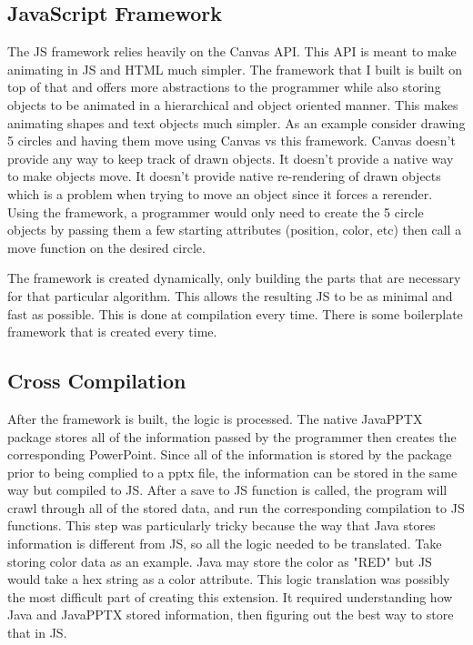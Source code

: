 \documentclass[12pt,twoside]{reedthesis}
\begin{document}
\subsection{JavaScript Framework}
The JS framework relies heavily on the Canvas API. This API is meant to make animating in JS and HTML much simpler. The framework that I built is built on top of that and offers more abstractions to the programmer while also storing objects to be animated in a hierarchical and object oriented manner. This makes animating shapes and text objects much simpler. As an example consider drawing 5 circles and having them move using Canvas vs this framework. Canvas doesn't provide any way to keep track of drawn objects. It doesn't provide a native way to make objects move. It doesn't provide native re-rendering of drawn objects which is a problem when trying to move an object since it forces a rerender. Using the framework, a programmer would only need to create the 5 circle objects by passing them a few starting attributes (position, color, etc) then call a move function on the desired circle.

The framework is created dynamically, only building the parts that are necessary for that particular algorithm. This allows the resulting JS to be as minimal and fast as possible. This is done at compilation every time. There is some boilerplate framework that is created every time. 

\subsection{Cross Compilation}
After the framework is built, the logic is processed. The native JavaPPTX package stores all of the information passed by the programmer then creates the corresponding PowerPoint. Since all of the information is stored by the package prior to being complied to a pptx file, the information can be stored in the same way but compiled to JS. After a save to JS function is called, the program will crawl through all of the stored data, and run the corresponding compilation to JS functions. This step was particularly tricky because the way that Java stores information is different from JS, so all the logic needed to be translated. Take storing color data as an example. Java may store the color as "RED" but JS would take a hex string as a color attribute. This logic translation was possibly the most difficult part of creating this extension. It required understanding how Java and  JavaPPTX stored information, then figuring out the best way to store that in JS. 
\end{document}
